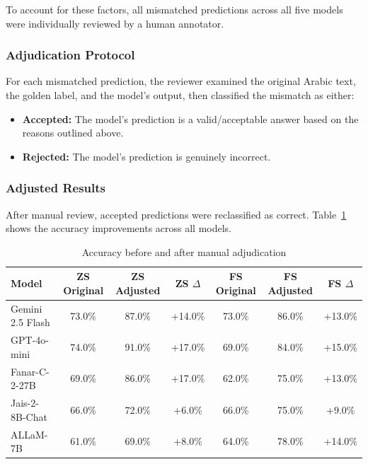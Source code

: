 To account for these factors, all mismatched predictions across all five models were individually reviewed by a human annotator.

\subsubsection{Adjudication Protocol}

For each mismatched prediction, the reviewer examined the original Arabic text, the golden label, and the model's output, then classified the mismatch as either:
\begin{itemize}
    \item \textbf{Accepted:} The model's prediction is a valid/acceptable answer based on the reasons outlined above.
    \item \textbf{Rejected:} The model's prediction is genuinely incorrect.
\end{itemize}

\subsubsection{Adjusted Results}

After manual review, accepted predictions were reclassified as correct. Table~\ref{tab:adjusted_results} shows the accuracy improvements across all models.

\begin{table}[H]
    \centering
    \caption{Accuracy before and after manual adjudication}
    \label{tab:adjusted_results}
    \begin{tabular}{|l|c|c|c|c|c|c|}
        \hline
        \textbf{Model} & \textbf{ZS Original} & \textbf{ZS Adjusted} & \textbf{ZS $\Delta$} & \textbf{FS Original} & \textbf{FS Adjusted} & \textbf{FS $\Delta$} \\
        \hline
        Gemini 2.5 Flash & 73.0\% & 87.0\% & +14.0\% & 73.0\% & 86.0\% & +13.0\% \\
        GPT-4o-mini & 74.0\% & 91.0\% & +17.0\% & 69.0\% & 84.0\% & +15.0\% \\
        Fanar-C-2-27B & 69.0\% & 86.0\% & +17.0\% & 62.0\% & 75.0\% & +13.0\% \\
        Jais-2-8B-Chat & 66.0\% & 72.0\% & +6.0\% & 66.0\% & 75.0\% & +9.0\% \\
        ALLaM-7B & 61.0\% & 69.0\% & +8.0\% & 64.0\% & 78.0\% & +14.0\% \\
        \hline
    \end{tabular}
\end{table}

